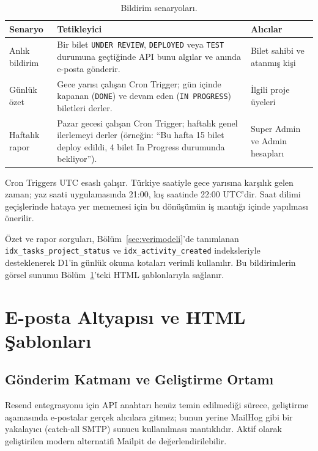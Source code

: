\documentclass[11pt,a4paper]{article}
\begin{document}
\begin{table}[H]
\centering
\small
\begin{tabularx}{\textwidth}{p{3.0cm}Xp{3.8cm}}
\toprule
\textbf{Senaryo} & \textbf{Tetikleyici} & \textbf{Alıcılar}\\
\midrule
Anlık bildirim & Bir bilet \texttt{UNDER REVIEW}, \texttt{DEPLOYED} veya \texttt{TEST} durumuna geçtiğinde API bunu algılar ve anında e-posta gönderir. & Bilet sahibi ve atanmış kişi\\
\addlinespace
Günlük özet    & Gece yarısı çalışan Cron Trigger; gün içinde kapanan (\texttt{DONE}) ve devam eden (\texttt{IN PROGRESS}) biletleri derler. & İlgili proje üyeleri\\
\addlinespace
Haftalık rapor & Pazar gecesi çalışan Cron Trigger; haftalık genel ilerlemeyi derler (örneğin: ``Bu hafta 15 bilet deploy edildi, 4 bilet In Progress durumunda bekliyor''). & Super Admin ve Admin hesapları\\
\bottomrule
\end{tabularx}
\caption{Bildirim senaryoları.}
\label{tab:bildirim}
\end{table}

Cron Triggers UTC esaslı çalışır. Türkiye saatiyle gece yarısına
karşılık gelen zaman; yaz saati uygulamasında 21:00, kış saatinde
22:00 UTC'dir. Saat dilimi geçişlerinde hataya yer mememesi için bu
dönüşümün iş mantığı içinde yapılması önerilir.

Özet ve rapor sorguları, Bölüm~\ref{sec:verimodeli}'de tanımlanan
\texttt{idx\_tasks\_\allowbreak project\_\allowbreak status} ve
\texttt{idx\_activity\_\allowbreak created}
indeksleriyle desteklenerek D1'in günlük okuma kotaları verimli
kullanılır. Bu bildirimlerin görsel sunumu
Bölüm~\ref{sec:eposta}'teki HTML şablonlarıyla sağlanır.

\section{E-posta Altyapısı ve HTML Şablonları}
\label{sec:eposta}

\subsection{Gönderim Katmanı ve Geliştirme Ortamı}

Resend entegrasyonu için API anahtarı henüz temin edilmediği sürece,
geliştirme aşamasında e-postalar gerçek alıcılara gitmez; bunun yerine
MailHog gibi bir yakalayıcı (catch-all SMTP) sunucu kullanılması
mantıklıdır. Aktif olarak geliştirilen modern alternatifi Mailpit de
değerlendirilebilir.
\end{document}
